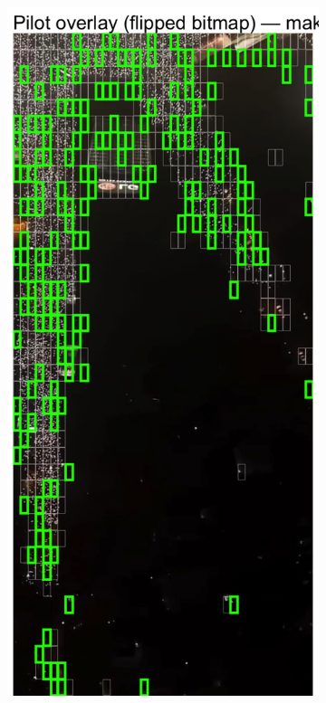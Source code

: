 \documentclass[a4paper,12pt]{article}
\begin{document}
\begin{figure}[H]
	\begin{subfigure}[b]{0.3\textwidth}
	  \centering
	  \includegraphics[width=\textwidth]{../outputs/sampling_outputs/main_overlays_image/main_overlay_makenzijeva.png}

\end{subfigure}
\end{figure}
\end{document}
